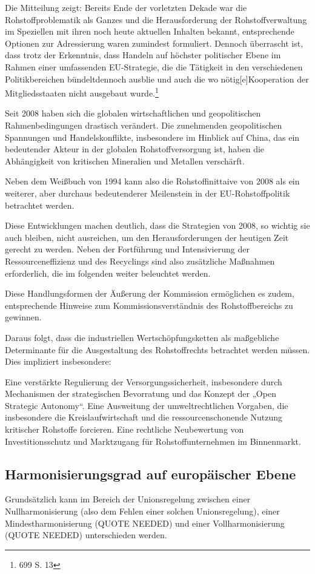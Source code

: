 \documentclass[12pt,a4paper,oneside]{book} %
\begin{document}
Die Mitteilung zeigt: Bereits Ende der vorletzten Dekade war die Rohstoffproblematik als Ganzes und die Herausforderung der Rohstoffverwaltung im Speziellen mit ihren noch heute aktuellen Inhalten bekannt, entsprechende Optionen zur Adressierung waren zumindest formuliert. Dennoch überrascht ist, dass trotz der Erkenntnis, dass Handeln \glqq auf höchster politischer Ebene im Rahmen einer umfassenden EU-Strategie, die die Tätigkeit in den verschiedenen Politikbereichen bündelt\grqq dennoch ausblie und auch die \glqq wo nötig[e]\grqq Kooperation der Mitgliedsstaaten nicht ausgebaut wurde.\footnote{699 S. 13}


Seit 2008 haben sich die globalen wirtschaftlichen und geopolitischen Rahmenbedingungen drastisch verändert. Die zunehmenden geopolitischen Spannungen und Handelskonflikte, insbesondere im Hinblick auf China, das ein bedeutender Akteur in der globalen Rohstoffversorgung ist, haben die Abhängigkeit von kritischen Mineralien und Metallen verschärft. 
	
Neben dem Weißbuch von 1994 kann also die Rohstoffinittaive von 2008 als ein weiterer, aber durchaus bedeutenderer Meilenstein in der EU-Rohstoffpolitik betrachtet werden.
	
Diese Entwicklungen machen deutlich, dass die Strategien von 2008, so wichtig sie auch bleiben, nicht ausreichen, um den Herausforderungen der heutigen Zeit gerecht zu werden. Neben der Fortführung und Intensivierung der Ressourceneffizienz und des Recyclings sind also zusätzliche Maßnahmen erforderlich, die im folgenden weiter beleuchtet werden.
	
Diese Handlungsformen der Äußerung der Kommission ermöglichen es zudem, entsprechende Hinweise zum Kommissionsverständnis des Rohstoffbereichs zu gewinnen.

Daraus folgt, dass die industriellen Wertschöpfungsketten als maßgebliche Determinante für die Ausgestaltung des Rohstoffrechts betrachtet werden müssen. Dies impliziert insbesondere:

Eine verstärkte Regulierung der Versorgungssicherheit, insbesondere durch Mechanismen der strategischen Bevorratung und das Konzept der „Open Strategic Autonomy“.
Eine Ausweitung der umweltrechtlichen Vorgaben, die insbesondere die Kreislaufwirtschaft und die ressourcenschonende Nutzung kritischer Rohstoffe forcieren.
Eine rechtliche Neubewertung von Investitionsschutz und Marktzugang für Rohstoffunternehmen im Binnenmarkt.
	
\subsection{Harmonisierungsgrad auf europäischer Ebene}
Grundsätzlich kann im Bereich der Unionsregelung zwischen einer Nullharmonisierung (also dem Fehlen einer solchen Unionsregelung), einer Mindestharmonisierung (QUOTE NEEDED) und einer Vollharmonisierung (QUOTE NEEDED) unterschieden werden. 
	
\end{document}
